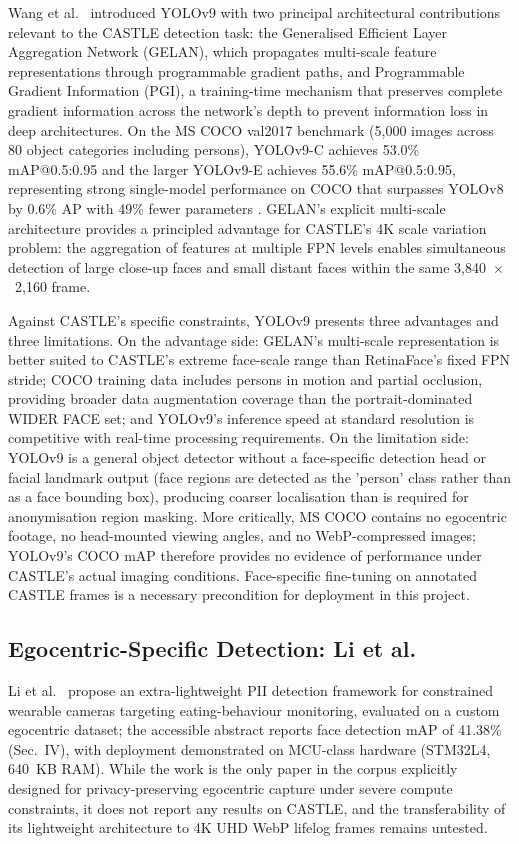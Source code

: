 \documentclass[12pt, onecolumn]{IEEEtran}
\begin{document}
Wang et al.\ \cite{wang2024yolov9} introduced YOLOv9 with two principal architectural contributions relevant to the
CASTLE detection task: the Generalised Efficient Layer Aggregation Network (GELAN), which propagates
multi-scale feature representations through programmable gradient paths, and Programmable Gradient
Information (PGI), a training-time mechanism that preserves complete gradient information across the
network's depth to prevent information loss in deep architectures. On the MS COCO val2017 benchmark (5,000 images across 80 object categories including persons), YOLOv9-C achieves 53.0\% mAP@0.5:0.95 and
the larger YOLOv9-E achieves 55.6\% mAP@0.5:0.95, representing
strong single-model performance on COCO that surpasses YOLOv8 by 0.6\% AP with 49\% fewer parameters \cite{wang2024yolov9}. GELAN's explicit multi-scale
architecture provides a principled advantage for CASTLE's 4K scale variation problem: the aggregation of
features at multiple FPN levels enables simultaneous detection of large close-up faces and small distant
faces within the same 3,840~$\times$~2,160 frame.

Against CASTLE's specific constraints, YOLOv9 presents three advantages and three limitations. On the
advantage side: GELAN's multi-scale representation is better suited to CASTLE's extreme face-scale range
than RetinaFace's fixed FPN stride; COCO training data includes persons in motion and partial occlusion,
providing broader data augmentation coverage than the portrait-dominated WIDER FACE set; and YOLOv9's
inference speed at standard resolution is competitive with real-time processing requirements. On the
limitation side: YOLOv9 is a general object detector without a face-specific detection head or facial
landmark output (face regions are detected as the 'person' class rather than as a face bounding box),
producing coarser localisation than is required for anonymisation region masking. More critically, MS COCO
contains no egocentric footage, no head-mounted viewing angles, and no WebP-compressed images; YOLOv9's
COCO mAP therefore provides no evidence of performance under CASTLE's actual imaging conditions.
Face-specific fine-tuning on annotated CASTLE frames is a necessary precondition for deployment in this
project.

\subsection{Egocentric-Specific Detection: Li et al.}

Li et al.\ \cite{li2025lightweight} propose an extra-lightweight PII detection framework for constrained wearable cameras targeting eating-behaviour monitoring, evaluated on a custom egocentric dataset; the accessible abstract reports face detection mAP of 41.38\% (Sec.~IV), with deployment demonstrated on MCU-class hardware (STM32L4, 640~KB RAM).
While the work is the only paper in the corpus explicitly designed for privacy-preserving egocentric capture under severe compute constraints, it does not report any results on CASTLE, and the transferability of its lightweight architecture to 4K UHD WebP lifelog frames remains untested.
\end{document}
